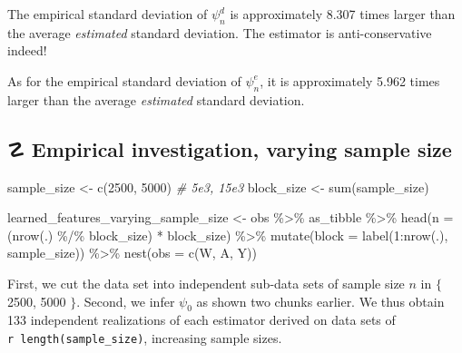 \documentclass[
  11pt,
  openright,twoside]{book}
\newenvironment{Shaded}{\begin{snugshade}}{\end{snugshade}}
\newcommand{\AttributeTok}[1]{\textcolor[rgb]{0.77,0.63,0.00}{#1}}
\newcommand{\CommentTok}[1]{\textcolor[rgb]{0.56,0.35,0.01}{\textit{#1}}}
\newcommand{\DecValTok}[1]{\textcolor[rgb]{0.00,0.00,0.81}{#1}}
\newcommand{\FunctionTok}[1]{\textcolor[rgb]{0.00,0.00,0.00}{#1}}
\newcommand{\NormalTok}[1]{#1}
\newcommand{\OtherTok}[1]{\textcolor[rgb]{0.56,0.35,0.01}{#1}}
\newcommand{\SpecialCharTok}[1]{\textcolor[rgb]{0.00,0.00,0.00}{#1}}
\DeclareRobustCommand{\stixdanger}{%
  {\usefont{U}{stixbbit}{m}{it}\symbol{"F6}}%
}
\theoremstyle{definition}
\theoremstyle{definition}
\theoremstyle{definition}
\theoremstyle{definition}
\theoremstyle{remark}
\begin{document}
The empirical standard deviation of \(\psi_{n}^{d}\) is approximately
8.307 times larger than the average \emph{estimated}
standard deviation. The estimator is anti-conservative indeed!

As for the empirical standard deviation of \(\psi_{n}^{e}\), it is approximately
5.962 times larger than the average \emph{estimated}
standard deviation.

\hypertarget{empirical-inves-Gcomp-varying}{%
\subsection{\texorpdfstring{☡ \stixdanger{} Empirical investigation, varying sample size}{☡  Empirical investigation, varying sample size}}\label{empirical-inves-Gcomp-varying}}

\begin{Shaded}
\begin{Highlighting}[]
\NormalTok{sample\_size }\OtherTok{\textless{}{-}} \FunctionTok{c}\NormalTok{(}\DecValTok{2500}\NormalTok{, }\DecValTok{5000}\NormalTok{) }\CommentTok{\# 5e3, 15e3}
\NormalTok{block\_size }\OtherTok{\textless{}{-}} \FunctionTok{sum}\NormalTok{(sample\_size)}


\NormalTok{learned\_features\_varying\_sample\_size }\OtherTok{\textless{}{-}}\NormalTok{ obs }\SpecialCharTok{\%\textgreater{}\%}\NormalTok{ as\_tibble }\SpecialCharTok{\%\textgreater{}\%} 
  \FunctionTok{head}\NormalTok{(}\AttributeTok{n =}\NormalTok{ (}\FunctionTok{nrow}\NormalTok{(.) }\SpecialCharTok{\%/\%}\NormalTok{ block\_size) }\SpecialCharTok{*}\NormalTok{ block\_size) }\SpecialCharTok{\%\textgreater{}\%} 
  \FunctionTok{mutate}\NormalTok{(}\AttributeTok{block =} \FunctionTok{label}\NormalTok{(}\DecValTok{1}\SpecialCharTok{:}\FunctionTok{nrow}\NormalTok{(.), sample\_size)) }\SpecialCharTok{\%\textgreater{}\%}
  \FunctionTok{nest}\NormalTok{(}\AttributeTok{obs =} \FunctionTok{c}\NormalTok{(W, A, Y))}
\end{Highlighting}
\end{Shaded}

First, we cut the data set into independent sub-data sets of sample size \(n\)
in \(\{\) 2500, 5000 \(\}\). Second, we infer \(\psi_{0}\)
as shown two chunks earlier. We thus obtain 133
independent realizations of each estimator derived on data sets of \texttt{r\ length(sample\_size)}, increasing sample sizes.
\end{document}
